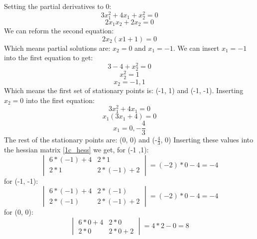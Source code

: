 \documentclass{article}
\begin{document}
Setting the partial derivatives to 0:
\begin{equation*}
    3x_1^2 + 4x_1 + x_2^2 = 0
\end{equation*}
\begin{equation*}
    2x_1x_2 + 2x_2 = 0
\end{equation*}
We can reform the second equation:
\begin{equation*}
    2x_2(x1 + 1) = 0
\end{equation*}
Which means partial solutions are: $x_2 = 0$ and $x_1 = -1$. We can insert $x_1 = -1$ into the first equation to get:
\begin{equation*}
    3 - 4 + x_2^2 = 0
\end{equation*}
\begin{equation*}
    x_2^2 = 1
\end{equation*}
\begin{equation*}
    x_2 = -1, 1
\end{equation*}
Which means the first set of stationary points is: (-1, 1) and (-1, -1). Inserting $x_2 = 0$ into the first equation:
\begin{equation*}
    3x_1^2 + 4x_1 = 0
\end{equation*}
\begin{equation*}
    x_1(3x_1 + 4) = 0
\end{equation*}
\begin{equation*}
    x_1 = 0, -\frac{4}{3}
\end{equation*}
The rest of the stationary points are: (0, 0) and (-$\frac{4}{3}$, 0)
Inserting these values into the hessian matrix \eqref{1c_hess} we get, for (-1 ,1):
\begin{equation*}
    \begin{vmatrix}
        6*(-1) + 4 & 2*1 \\ 2*1 & 2*(-1) + 2
    \end{vmatrix} = (-2)*0 - 4 = -4
\end{equation*}
for (-1, -1):
\begin{equation*}
    \begin{vmatrix}
        6*(-1) + 4 & 2*(-1) \\ 2*(-1) & 2*(-1) + 2
    \end{vmatrix} = (-2)*0 - 4 = -4
\end{equation*}
for (0, 0):
\begin{equation*}
    \begin{vmatrix}
        6*0 + 4 & 2*0 \\ 2*0 & 2*0 + 2
    \end{vmatrix} = 4 * 2 - 0 = 8
\end{equation*}
\end{document}
